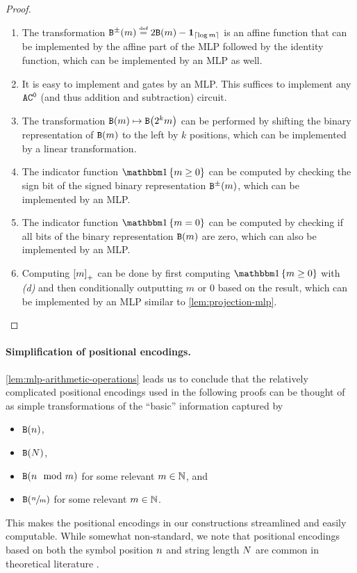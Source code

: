 \begin{proof} \
   \begin{enumerate}[label=\textit{(\alph*)}]
      \item The transformation $\sbinFun{m} \defeq 2 \binFun{m} - \one_{\ceil{\log m}}$ is an affine function that can be implemented by the affine part of the MLP followed by the identity function, which can be implemented by an MLP as well.
      \item It is easy to implement \andGate and \notGate gates by an MLP. 
      This suffices to implement any ${{{{{{\mathtt{AC}}}^{\mathtt{0}}}}}}$ (and thus addition and subtraction) circuit.
      \item The transformation $\binFun{m} \mapsto \binFun{2^k m}$ can be performed by shifting the binary representation of $\binFun{m}$ to the left by $k$ positions, which can be implemented by a linear transformation.
      \item The indicator function $\ind{m \geq 0}$ can be computed by checking the sign bit of the signed binary representation $\sbinFun{m}$, which can be implemented by an MLP.
      \item The indicator function $\ind{m = 0}$ can be computed by checking if all bits of the binary representation $\binFun{m}$ are zero, which can also be implemented by an MLP.
      \item Computing ${\left[ m \right]_{+}}$ can be done by first computing $\ind{m \geq 0}$ with \textit{(d)} and then conditionally outputting $m$ or $0$ based on the result, which can be implemented by an MLP similar to \cref{lem:projection-mlp}.
   \end{enumerate}
\end{proof}

\paragraph{Simplification of positional encodings.}
\cref{lem:mlp-arithmetic-operations} leads us to conclude that the relatively complicated positional encodings used in the following proofs can be thought of as simple transformations of the ``basic'' information captured by
\begin{itemize}[noitemsep,topsep=0pt]
   \item $\binEnc{\stridx}$,
   \item $\binEnc{\strlen}$,
   \item $\binEnc{\stridx \mod m}$ for some relevant $m \in {{\mathbb{N}}}$, and
   \item $\binEnc{\sfrac{\stridx}{m}}$ for some relevant $m \in {{\mathbb{N}}}$.
\end{itemize}
This makes the positional encodings in our constructions streamlined and easily computable. 
While somewhat non-standard, we note that positional encodings based on both the symbol position ${{n}}$ and string length ${{N}}$ are common in theoretical literature \citep{chiang-cholak-2022-overcoming}.

